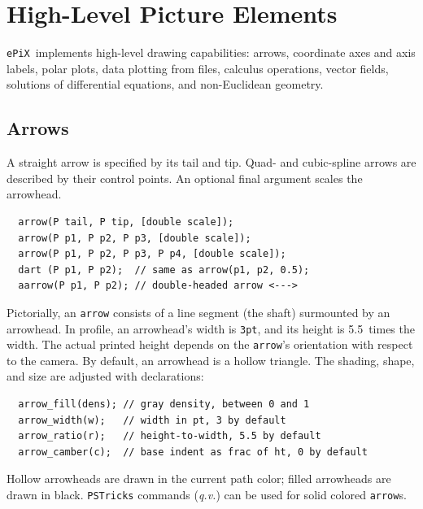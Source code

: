 \documentclass[12pt]{report}
\newcommand{\code}[1]{\texttt{#1}}
\newcommand{\ePiX}{\code{ePiX}}
\newcommand{\CXX}{\code{C++}}
\begin{document}


\section{High-Level Picture Elements}

\ePiX\ implements high-level drawing capabilities: arrows, coordinate
axes and axis labels, polar plots, data plotting from files, calculus
operations, vector fields, solutions of differential equations, and
non-Euclidean geometry.


\subsection*{Arrows} 

 A straight arrow is specified by its tail and
tip. Quad- and cubic-spline arrows are described by their control
points. An optional final argument scales the arrowhead.
\begin{verbatim}
  arrow(P tail, P tip, [double scale]);
  arrow(P p1, P p2, P p3, [double scale]);
  arrow(P p1, P p2, P p3, P p4, [double scale]);
  dart (P p1, P p2);  // same as arrow(p1, p2, 0.5);
  aarrow(P p1, P p2); // double-headed arrow <--->
\end{verbatim}

Pictorially, an \code{arrow} consists of a line segment (the shaft)
surmounted by an arrowhead. In profile, an arrowhead's width is
\code{3pt}, and its height is 5.5~times the width.  The actual printed
height depends on the \code{arrow}'s orientation with respect to the
camera.  By default, an arrowhead is a hollow triangle. The shading,
shape, and size are adjusted with declarations:
\begin{verbatim}
  arrow_fill(dens); // gray density, between 0 and 1
  arrow_width(w);   // width in pt, 3 by default
  arrow_ratio(r);   // height-to-width, 5.5 by default
  arrow_camber(c);  // base indent as frac of ht, 0 by default
\end{verbatim}
\begin{center}
   \qquad
   \qquad
  
\end{center}

Hollow arrowheads are drawn in the current path color; filled
arrowheads are drawn in black. \code{PSTricks}
commands (\emph{q.v.}) can be used for solid colored \code{arrow}s.
\end{document}
